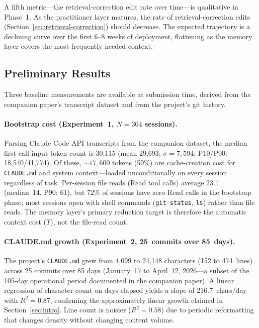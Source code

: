 \documentclass[11pt]{article}
\begin{document}
A fifth metric---the retrieval-correction edit rate over time---is qualitative in Phase~1.
As the practitioner layer matures, the rate of retrieval-correction edits (Section~\ref{sec:retrieval-correction}) should decrease.
The expected trajectory is a declining curve over the first 6--8 weeks of deployment, flattening as the memory layer covers the most frequently needed context.

\subsection{Preliminary Results}
\label{sec:preliminary}

Three baseline measurements are available at submission time, derived from the companion paper's transcript dataset and from the project's git history.

\paragraph{Bootstrap cost (Experiment~1, $N{=}304$ sessions).}
Parsing Claude Code API transcripts from the companion dataset, the median first-call input token count is 30{,}115 (mean 29{,}693; $\sigma{=}7{,}594$; P10/P90: 18{,}540/41{,}774).
Of these, ${\sim}17{,}600$ tokens (59\%) are cache-creation cost for \texttt{CLAUDE.md} and system context---loaded unconditionally on every session regardless of task.
Per-session file reads (Read tool calls) average 23.1 (median~14, P90: 61), but 72\% of sessions have zero Read calls in the bootstrap phase; most sessions open with shell commands (\texttt{git status}, \texttt{ls}) rather than file reads.
The memory layer's primary reduction target is therefore the automatic context cost ($T$), not the file-read count.

\paragraph{CLAUDE.md growth (Experiment~2, 25~commits over 85~days).}
The project's \texttt{CLAUDE.md} grew from 4{,}099 to 24{,}148 characters (152 to 474~lines) across 25 commits over 85 days (January~17 to April~12, 2026---a subset of the 105-day operational period documented in the companion paper).
A linear regression of character count on days elapsed yields a slope of 216.7~chars/day with $R^2 = 0.87$, confirming the approximately linear growth claimed in Section~\ref{sec:intro}.
Line count is noisier ($R^2 = 0.58$) due to periodic reformatting that changes density without changing content volume.
\end{document}
